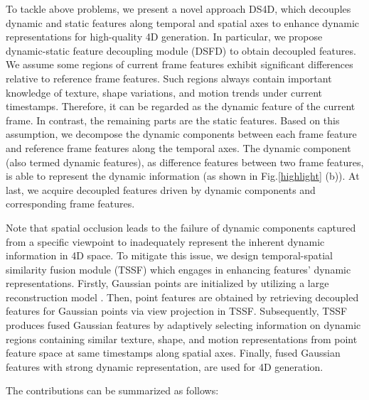 To tackle above problems, we present a novel approach DS4D, which decouples dynamic and static features along temporal and spatial axes to enhance dynamic representations for high-quality 4D generation. In particular, we propose dynamic-static feature decoupling module (DSFD) to obtain decoupled features. We assume some regions of current frame features exhibit significant differences relative to reference frame features. Such regions always contain important knowledge of texture, shape variations, and motion trends under current timestamps. Therefore, it can be regarded as the dynamic feature of the current frame. In contrast, the remaining parts are the static features. Based on this assumption, we decompose the dynamic components between each frame feature and reference frame features along the temporal axes. The dynamic component (also termed dynamic features), as difference features between two frame features, is able to represent the dynamic information (as shown in Fig.\ref{highlight} (b)). At last, we acquire decoupled features driven by dynamic components and corresponding frame features. 

Note that spatial occlusion leads to the failure of dynamic components captured from a specific viewpoint to inadequately represent the inherent dynamic information in 4D space. To mitigate this issue, we design temporal-spatial similarity fusion module (TSSF) which engages in enhancing features' dynamic representations. Firstly, Gaussian points are initialized by utilizing a large reconstruction model \cite{xu2024instantmesh}. Then, point features are obtained by retrieving decoupled features for Gaussian points via view projection in TSSF. Subsequently, TSSF produces fused Gaussian features by adaptively selecting information on dynamic regions containing similar texture, shape, and motion representations from point feature space at same timestamps along spatial axes. Finally, fused Gaussian features with strong dynamic representation, are used for 4D generation. 


The contributions can be summarized as follows:

